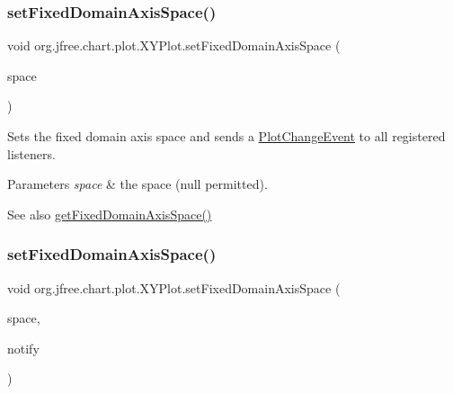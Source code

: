 \subsubsection{\texorpdfstring{set\+Fixed\+Domain\+Axis\+Space()}{setFixedDomainAxisSpace()}\hspace{0.1cm}{\footnotesize\ttfamily [1/2]}}
{\footnotesize\ttfamily void org.\+jfree.\+chart.\+plot.\+X\+Y\+Plot.\+set\+Fixed\+Domain\+Axis\+Space (\begin{DoxyParamCaption}\item[{\mbox{\hyperlink{classorg_1_1jfree_1_1chart_1_1axis_1_1_axis_space}{Axis\+Space}}}]{space }\end{DoxyParamCaption})}

Sets the fixed domain axis space and sends a \mbox{\hyperlink{}{Plot\+Change\+Event}} to all registered listeners.


\begin{DoxyParams}{Parameters}
{\em space} & the space ({\ttfamily null} permitted).\\
\hline
\end{DoxyParams}
\begin{DoxySeeAlso}{See also}
\mbox{\hyperlink{classorg_1_1jfree_1_1chart_1_1plot_1_1_x_y_plot_addf279078b32787b75a4562fb61734be}{get\+Fixed\+Domain\+Axis\+Space()}} 
\end{DoxySeeAlso}
\mbox{\label{classorg_1_1jfree_1_1chart_1_1plot_1_1_x_y_plot_a0cfbdc84e78b134669d88f69153f8874}} 
\subsubsection{\texorpdfstring{set\+Fixed\+Domain\+Axis\+Space()}{setFixedDomainAxisSpace()}\hspace{0.1cm}{\footnotesize\ttfamily [2/2]}}
{\footnotesize\ttfamily void org.\+jfree.\+chart.\+plot.\+X\+Y\+Plot.\+set\+Fixed\+Domain\+Axis\+Space (\begin{DoxyParamCaption}\item[{\mbox{\hyperlink{classorg_1_1jfree_1_1chart_1_1axis_1_1_axis_space}{Axis\+Space}}}]{space,  }\item[{boolean}]{notify }\end{DoxyParamCaption})}

